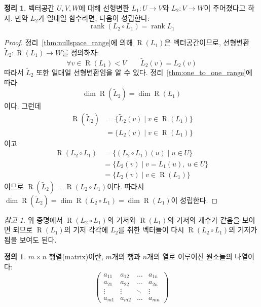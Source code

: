 \documentclass[unfonts,oneside,a4paper]{oblivoir}
\theoremstyle{definition}
\newtheorem{definition}{정의}[section]
\theoremstyle{theorem}
\newtheorem{theorem}{정리}[section]
\theoremstyle{theorem}
\theoremstyle{remark}
\newtheorem*{remark}{참고}
\theoremstyle{remark}
\theoremstyle{remark}
\theoremstyle{remark}
\renewcommand{\vec}[1]{\bm{\mathit{#1}}}
\DeclareMathOperator{\Range}{R}
\DeclareMathOperator{\rank}{rank}
\begin{document}
\begin{theorem} \label{thm:one_to_one_rank}
    벡터공간 $U, V, W$에 대해 선형변환 $L_1: U \rightarrow V$와 $L_2: V \rightarrow W$이 주어졌다고 하자.
    만약 $L_2$가 일대일 함수라면, 다음이 성립한다:
    \begin{equation*}
        \rank (L_2 \circ L_1) = \rank L_1
    \end{equation*}
\end{theorem}

\begin{proof}
    정리~\ref{thm:nullspace_range}에 의해 $\Range(L_1)$은 벡터공간이므로, 선형변환 $\tilde L_2: \Range(L_1) \rightarrow W$를 정의하자:
    \begin{equation*}
        \forall \vec v \in \Range(L_1) < V \qquad \tilde L_2(\vec v) = L_2(\vec v)
    \end{equation*}
    따라서 $\tilde L_2$ 또한 일대일 선형변환임을 알 수 있다.
    정리~\ref{thm:one_to_one_range}에 따라 
    \begin{equation*}
        \dim \Range(\tilde L_2) = \dim \Range(L_1)
    \end{equation*}
    이다.
    그런데
    \begin{align*}
        \Range(\tilde L_2) &= \{\tilde L_2 (\vec v) \mid \vec v \in \Range(L_1)\}\\
                          &= \{L_2(\vec v) \mid \vec v \in \Range(L_1)\}
    \end{align*}
    이고
    \begin{align*}
        \Range(L_2 \circ L_1) &= \{(L_2 \circ L_1) (\vec u) \mid \vec u \in U\}\\
                        &= \{L_2(\vec v) \mid \vec v = L_1(\vec u),\ \vec u \in U\}\\
                        &= \{L_2(\vec v) \mid \vec v \in \Range(L_1)\}
    \end{align*}
    이므로 $\Range(\tilde L_2) = \Range(L_2 \circ L_1)$이다.
    따라서 $\dim \Range(\tilde L_2) = \dim \Range(L_2 \circ L_1) = \dim \Range(L_1)$이 성립한다.
\end{proof}

\begin{remark}
    위 증명에서 $\Range(L_2 \circ L_1)$의 기저와 $\Range(L_1)$의 기저의 개수가 같음을 보이면 되므로 $\Range(L_1)$의 기저 각각에 $L_2$를 취한 벡터들이 다시 $\Range(L_2 \circ L_1)$의 기저가 됨을 보여도 된다.
\end{remark}

\begin{definition}
    $m \times n$ 행렬(matrix)이란, $m$개의 행과 $n$개의 열로 이루어진 원소들의 나열이다:
    \begin{equation*}
        \begin{pmatrix}
            a_{11} & a_{12} & \dots & a_{1n}\\
            a_{21} & a_{22} & \dots & a_{2n}\\
            \vdots & \vdots & \ddots & \vdots\\
            a_{m1} & a_{m2} & \dots & a_{mn}
        \end{pmatrix}
    \end{equation*}
\end{definition}
\end{document}
